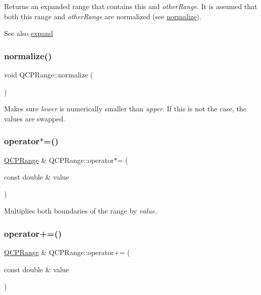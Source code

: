 Returns an expanded range that contains this and {\itshape other\+Range}. It is assumed that both this range and {\itshape other\+Range} are normalized (see \hyperlink{class_q_c_p_range_af914a7740269b0604d0827c634a878a9}{normalize}).

\begin{DoxySeeAlso}{See also}
\hyperlink{class_q_c_p_range_a0fa1bc8048be50d52bea93a8caf08305}{expand} 
\end{DoxySeeAlso}
\hypertarget{class_q_c_p_range_af914a7740269b0604d0827c634a878a9}{}\label{class_q_c_p_range_af914a7740269b0604d0827c634a878a9} 
\subsubsection{\texorpdfstring{normalize()}{normalize()}}
{\footnotesize\ttfamily void Q\+C\+P\+Range\+::normalize (\begin{DoxyParamCaption}{ }\end{DoxyParamCaption})}

Makes sure {\itshape lower} is numerically smaller than {\itshape upper}. If this is not the case, the values are swapped. \hypertarget{class_q_c_p_range_a6876aa9620ff2f0f7f1873f998372cef}{}\label{class_q_c_p_range_a6876aa9620ff2f0f7f1873f998372cef} 
\subsubsection{\texorpdfstring{operator$\ast$=()}{operator*=()}}
{\footnotesize\ttfamily \hyperlink{class_q_c_p_range}{Q\+C\+P\+Range} \& Q\+C\+P\+Range\+::operator$\ast$= (\begin{DoxyParamCaption}\item[{const double \&}]{value }\end{DoxyParamCaption})\hspace{0.3cm}{\ttfamily [inline]}}

Multiplies both boundaries of the range by {\itshape value}. \hypertarget{class_q_c_p_range_afea7c1aa7d08f061cd9bd8832f957df8}{}\label{class_q_c_p_range_afea7c1aa7d08f061cd9bd8832f957df8} 
\subsubsection{\texorpdfstring{operator+=()}{operator+=()}}
{\footnotesize\ttfamily \hyperlink{class_q_c_p_range}{Q\+C\+P\+Range} \& Q\+C\+P\+Range\+::operator+= (\begin{DoxyParamCaption}\item[{const double \&}]{value }\end{DoxyParamCaption})\hspace{0.3cm}{\ttfamily [inline]}}

